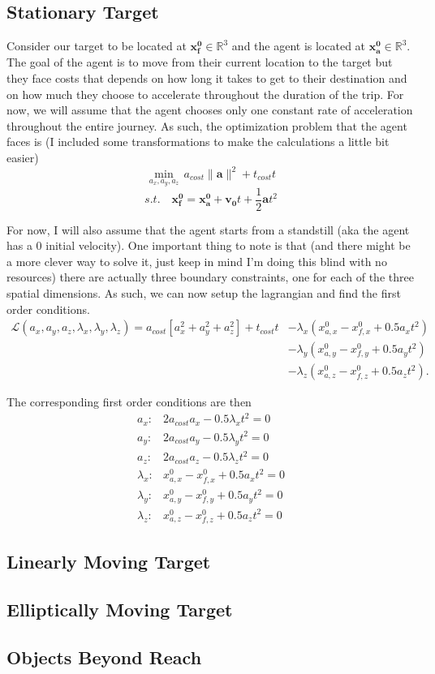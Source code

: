 \documentclass[11pt,english]{article}
\begin{document}
\subsection*{Stationary Target}

\noindent Consider our target to be located at $\mathbf{x_f^0}\in \mathbb{R}^3$ and the agent is located at $\mathbf{x_a^0}\in \mathbb{R}^3$. The goal of the agent is to move from their current location to the target but they face costs that depends on how long it takes to get to their destination and on how much they choose to accelerate throughout the duration of the trip. For now, we will assume that the agent chooses only one constant rate of acceleration throughout the entire journey. As such, the optimization problem that the agent faces is (I included some transformations to make the calculations a little bit easier) $$\min_{a_x,a_y,a_z}\,a_{cost}\lVert\mathbf{a}\rVert^2 + t_{cost}t$$ $$s.t. \quad \mathbf{x_f^0} = \mathbf{x_a^0} + \mathbf{v_0}t + \frac{1}{2}\mathbf{a}t^2$$

For now, I will also assume that the agent starts from a standstill (aka the agent has a 0 initial velocity). One important thing to note is that (and there might be a more clever way to solve it, just keep in mind I'm doing this blind with no resources) there are actually three boundary constraints, one for each of the three spatial dimensions. As such, we can now setup the lagrangian and find the first order conditions.
\begin{align*}
	\mathcal{L}(a_x,a_y,a_z,\lambda_x,\lambda_y,\lambda_z) = a_{cost}\left[a_x^2 + a_y^2 + a_z^2\right] + t_{cost}t &- \lambda_x(x_{a,x}^0 - x_{f,x}^0 + 0.5a_xt^2)\\ &- \lambda_y(x_{a,y}^0 - x_{f,y}^0 + 0.5a_yt^2)\\ &- \lambda_z(x_{a,z}^0 - x_{f,z}^0 + 0.5a_zt^2).
\end{align*}

The corresponding first order conditions are then
\begin{align*}
a_x:& 2a_{cost}a_x - 0.5\lambda_xt^2 = 0\\
a_y:& 2a_{cost}a_y - 0.5\lambda_yt^2 = 0\\
a_z:& 2a_{cost}a_z - 0.5\lambda_zt^2 = 0\\
\lambda_x:& x_{a,x}^0 - x_{f,x}^0 + 0.5a_xt^2 = 0\\
\lambda_y:& x_{a,y}^0 - x_{f,y}^0 + 0.5a_yt^2 = 0\\
\lambda_z:& x_{a,z}^0 - x_{f,z}^0 + 0.5a_zt^2 = 0
\end{align*}

\subsection*{Linearly Moving Target}


\subsection*{Elliptically Moving Target}


\subsection*{Objects Beyond Reach}
\end{document}
